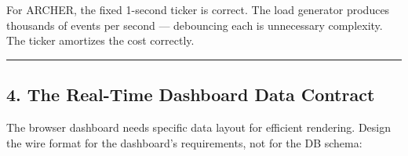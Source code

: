 \documentclass[
]{article}
\begin{document}
For ARCHER, the fixed 1-second ticker is correct. The load generator
produces thousands of events per second --- debouncing each is
unnecessary complexity. The ticker amortizes the cost correctly.

\begin{center}\rule{0.5\linewidth}{0.5pt}\end{center}

\hypertarget{the-real-time-dashboard-data-contract}{%
\subsection{4. The Real-Time Dashboard Data
Contract}\label{the-real-time-dashboard-data-contract}}

The browser dashboard needs specific data layout for efficient
rendering. Design the wire format for the dashboard's requirements, not
for the DB schema:
\end{document}
